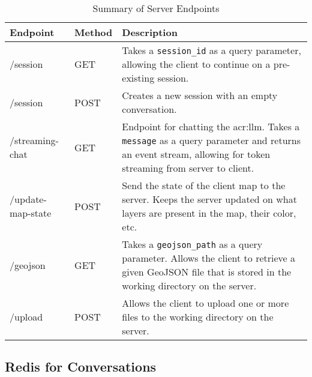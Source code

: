 \begin{table}[h]
    \centering
    \caption{Summary of Server Endpoints}
    \label{tbl:server-endpoints}
    \begin{tabular}{p{}p{}p{}}
        \toprule
        \textbf{Endpoint} & \textbf{Method} & \textbf{Description}                                                                                                                                                         \\
        \midrule
        /session          & GET             & Takes a \texttt{session\_id} as a query parameter, allowing the client to continue on a pre-existing session.                                                                \\
        /session          & POST            & Creates a new session with an empty conversation.                                                                                                                            \\
        /streaming-chat   & GET             & Endpoint for chatting the \acrshort{acr:llm}. Takes a \texttt{message} as a query parameter and returns an event stream, allowing for token streaming from server to client. \\
        /update-map-state & POST            & Send the state of the client map to the server. Keeps the server updated on what layers are present in the map, their color, etc.                                            \\
        /geojson          & GET             & Takes a \texttt{geojson\_path} as a query parameter. Allows the client to retrieve a given GeoJSON file that is stored in the working directory on the server.               \\
        /upload           & POST            & Allows the client to upload one or more files to the working directory on the server.                                                                                        \\
        \bottomrule
    \end{tabular}
\end{table}


\subsection{Redis for Conversations}

